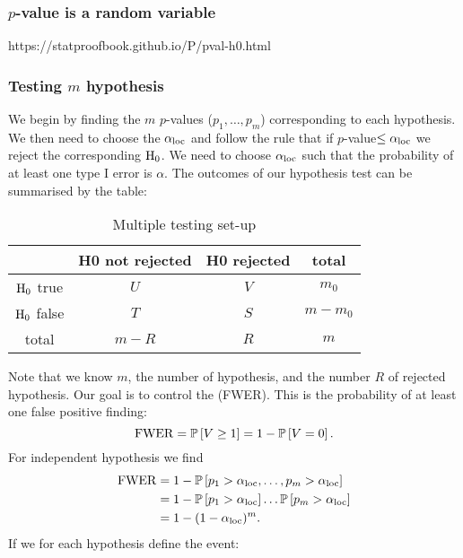 \subsubsection{$p$-value is a random variable}


https://statproofbook.github.io/P/pval-h0.html


\subsubsection{Testing $m$ hypothesis}
We begin by finding the $m$ $p$-values ($p_1,\dots,p_m$) corresponding to each hypothesis. We then need to choose the  $\alpha_{\mathrm{loc}}$ and follow the rule that if $p$-value$\leq\alpha_{\mathrm{loc}}$ we reject the corresponding $\mathrm{H}_0$. We need to choose $\alpha_{\mathrm{loc}}$ such that the probability of at least one type I error is $\alpha$. The outcomes of our hypothesis test can be summarised by the table:
\begin{table}[htbp]
    \centering
    \caption{Multiple testing set-up}
    \begin{tabular}{cccc}
        \hline
         & H0 not rejected & H0 rejected & total \\
        \hline
        $\mathrm{H}_0$ true  & $U$   & $V$ & $m_0$\\
        $\mathrm{H}_0$ false & $T$   & $S$ & $m-m_0$\\
        total            & $m-R$ & $R$ & $m$\\
        \hline
    \end{tabular}
\end{table}
Note that we know $m$, the number of hypothesis, and the number $R$ of rejected hypothesis. Our goal is to control the  (FWER). This is the probability of at least one false positive finding:
$$
    \mathrm{FWER} = \mathbb{P}\left[V\geq 1\right] = 1- \mathbb{P}\left[V=0\right].
$$
For independent hypothesis we find
\begin{align*}
    \mathrm{FWER} 
    &= 1- \mathbb{P}\left[p_1>\alpha_{\mathrm{loc}},\dots,p_m>\alpha_{\mathrm{loc}}\right]
    \\&= 1- \mathbb{P}\left[p_1>\alpha_{\mathrm{loc}}\right]\dots\mathbb{P}\left[p_m>\alpha_{\mathrm{loc}}\right]
    \\&= 1- (1-\alpha_{\mathrm{loc}})^m.
\end{align*}
If we for each hypothesis define the event:
